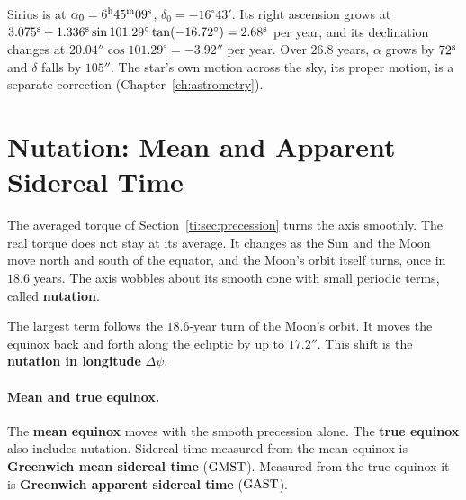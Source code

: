 \begin{example}
	Sirius is at $\alpha_0=6^{\rm h}45^{\rm m}09^{\rm s}$, $\delta_0=-16^\circ43'$. Its right ascension grows at $3.075^{\rm s}+1.336^{\rm s}\sin101.29^\circ\tan(-16.72^\circ)=2.68^{\rm s}$ per year, and its declination changes at $20.04''\cos101.29^\circ=-3.92''$ per year. Over $26.8$ years, $\alpha$ grows by $72^{\rm s}$ and $\delta$ falls by $105''$. The star's own motion across the sky, its proper motion, is a separate correction (Chapter~\ref{ch:astrometry}).
\end{example}

\section{Nutation: Mean and Apparent Sidereal Time}
\label{ti:sec:nutation}

The averaged torque of Section~\ref{ti:sec:precession} turns the axis smoothly. The real torque does not stay at its average. It changes as the Sun and the Moon move north and south of the equator, and the Moon's orbit itself turns, once in $18.6$ years. The axis wobbles about its smooth cone with small periodic terms, called \textbf{nutation}.

The largest term follows the $18.6$-year turn of the Moon's orbit. It moves the equinox back and forth along the ecliptic by up to $17.2''$. This shift is the \textbf{nutation in longitude} $\Delta\psi$.

\paragraph{Mean and true equinox.} The \textbf{mean equinox} moves with the smooth precession alone. The \textbf{true equinox} also includes nutation. Sidereal time measured from the mean equinox is \textbf{Greenwich mean sidereal time} ($\mathrm{GMST}$). Measured from the true equinox it is \textbf{Greenwich apparent sidereal time} ($\mathrm{GAST}$).

